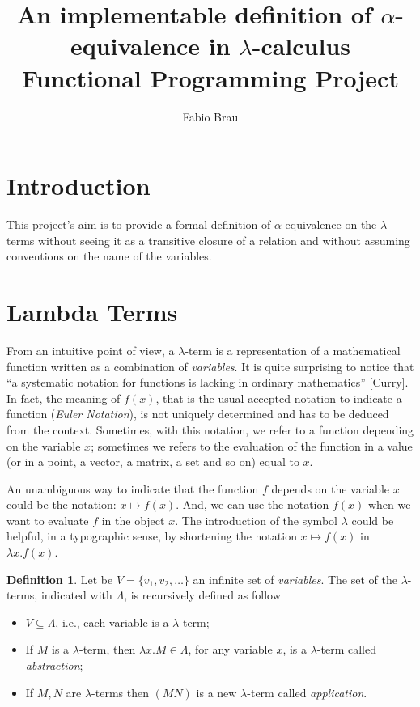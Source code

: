 \documentclass[a4paper,11pt]{article}
\title{An implementable definition of $\alpha$-equivalence in
$\lambda$-calculus\\
{\large Functional Programming Project}}
\author{Fabio Brau}
\theoremstyle{definition}
\newtheorem{defn}{Definition}
\begin{document}
\maketitle
\tableofcontents
\section{Introduction}


This project's aim is to provide a formal definition of $\alpha$-equivalence
on the $\lambda$-terms without seeing it as a transitive closure of a
relation and without assuming conventions on the name of the variables.


\section{Lambda Terms}
From an intuitive point of view, a $\lambda$-term is a representation of
a mathematical function written as a combination of \textit{variables}. It
is quite surprising to notice that ``a systematic notation for functions is lacking
in ordinary mathematics'' [Curry]. In fact, the meaning of $f(x)$, that is the usual
accepted notation to indicate a function (\textit{Euler Notation}), is not uniquely
determined and has to be deduced from the context. Sometimes, with this
notation, we refer to a function depending on the variable $x$; sometimes we refers to the
evaluation of the function in a value (or in a point, a vector, a matrix, a
set and so on) equal to $x$.

An unambiguous way to indicate that the function $f$ depends on the variable $x$ 
could be the notation: $x\mapsto f(x)$. And, we can use the notation $f(x)$
when we want to evaluate $f$ in the object $x$. The introduction of the
symbol $\lambda$ could be helpful, in a typographic sense, by shortening the
notation $x\mapsto f(x)$ in $\lambda x.f(x)$.

\begin{defn}
  Let be $V=\{v_1,v_2,\dots\}$ an infinite set of \textit{variables}. The
  set of the $\lambda$-terms, indicated with $\Lambda$, is recursively
  defined as follow
  \begin{itemize}
    \item $V\subseteq\Lambda$, i.e., each variable is a $\lambda$-term;
    \item If $M$ is a $\lambda$-term, then $\lambda x.M\in\Lambda$, for any variable
      $x$, is a $\lambda$-term called \textit{abstraction};
    \item If $M,N$ are $\lambda$-terms then $(MN)$ is a new $\lambda$-term
      called \textit{application}.
  \end{itemize}
\end{defn}
\end{document}
